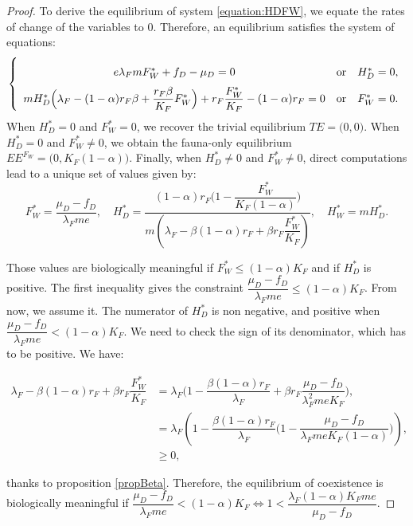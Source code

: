 \documentclass{article}
\newcommand{\lfw}{\lambda_{F}}
\newcommand{\lfw}{\lambda_{F}}
\theoremstyle{definition}
\theoremstyle{remark}
\begin{document}
\begin{proof}
To derive the equilibrium of system \eqref{equation:HDFW}, we equate the rates of change of the variables to 0. Therefore, an equilibrium satisfies the system of equations:
\begin{equation}\label{equation:system-equilibre, cI=0}
\def\arraystretch{2}
\left\lbrace \begin{array}{cll}
 e \lfw m F_W^* + f_D - \mu_D = 0& \mbox{or} & H_D^* = 0,\\
m H_D^*\Big(\lfw - (1-\alpha)r_F \beta + \dfrac{r_F \beta}{K_F}F_W^* \Big) + r_F \dfrac{F_W^*}{K_F} - (1-\alpha)r_F= 0& \mbox{or} & F^*_W = 0.
\end{array} \right.
\end{equation}
When $H_D^*=0$ and $F_W^*=0$, we recover the trivial equilibrium $TE = \Big(0,0\Big)$. When $H_D^*=0$ and $F_W^*\neq0$, we obtain the fauna-only equilibrium $EE^{F_W} = \Big(0, K_F(1-\alpha)\Big)$. Finally, when $H_D^*\neq0$ and $F_W^*\neq0$, direct computations lead to a unique set of values given by:
$$F^*_{W} = \dfrac{\mu_D - f_D}{\lfw m e},
\quad 
H^*_{D} = \dfrac{(1-\alpha)r_F\Big(1 - \dfrac{F^*_{W}}{K_F(1-\alpha)} \Big)}{m\left(\lfw - \beta (1-\alpha) r_F + \beta r_F  \dfrac{F^*_{W}}{K_F}\right)} ,
\quad 
H^*_{W} = m H^*_{D}.$$

Those values are biologically meaningful if $F_W^* \leq (1-\alpha) K_F$ and if $H_D^*$ is positive. The first inequality gives the constraint $\dfrac{\mu_D - f_D}{\lfw m e} \leq (1-\alpha)K_F$. From now, we assume it. The numerator of $H^*_{D}$ is non negative, and positive when $\dfrac{\mu_D - f_D}{\lfw m e} < (1-\alpha)K_F$. We need to check the sign of its denominator, which has to be positive. We have:

\begin{align*}
\lfw - \beta (1-\alpha) r_F + \beta r_F  \dfrac{F^*_{W}}{K_F} &= \lfw\Big(1 - \dfrac{\beta (1-\alpha) r_F}{\lfw} + \beta r_F  \dfrac{\mu_D - f_D}{\lfw^2 m e K_F} \Big), \\
&= \lfw\left(1 - \dfrac{\beta (1-\alpha) r_F}{\lfw}\Big(1 -\dfrac{\mu_D - f_D}{\lfw m e K_F(1-\alpha)} \Big) \right), \\
&\geq 0,
\end{align*}

thanks to proposition \ref{propBeta}. Therefore, the equilibrium of coexistence is biologically meaningful if $\dfrac{\mu_D - f_D}{\lfw m e} < (1-\alpha)K_F \Leftrightarrow 1 < \dfrac{\lfw (1-\alpha)K_F m e}{\mu_D - f_D}$.

\end{proof}
\end{document}
